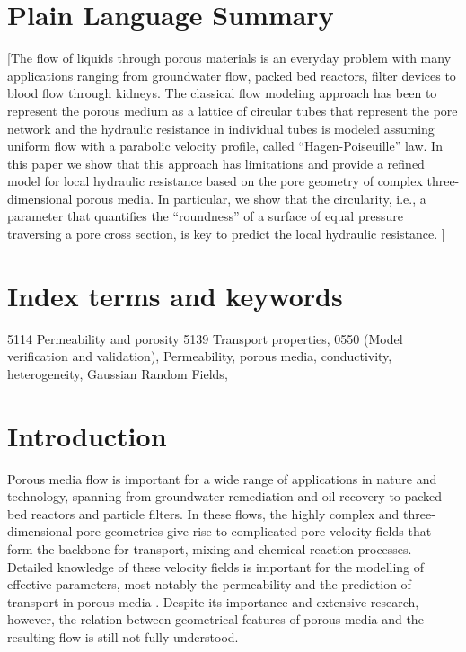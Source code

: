 \documentclass[draft]{agujournal2019}
\begin{document}
\section*{Plain Language Summary}
[The flow of liquids through porous materials is an everyday problem with many applications ranging from groundwater flow, packed bed reactors, filter devices to blood flow through kidneys. The classical flow modeling approach has been to represent the porous medium as a lattice of circular tubes that represent the pore network and the hydraulic resistance in individual tubes is modeled assuming uniform flow with a parabolic velocity profile, called “Hagen-Poiseuille” law. In this paper we show that this approach has limitations and provide a refined model for local hydraulic resistance based on the pore geometry of complex three-dimensional porous media. In particular, we show that the circularity, i.e., a parameter that quantifies the “roundness” of a surface of equal pressure traversing a pore cross section, is key to predict the local hydraulic resistance.
]

\section*{Index terms and keywords}
5114 Permeability and porosity 5139 Transport properties, 0550 (Model verification and validation), Permeability, porous media, conductivity, heterogeneity, Gaussian Random Fields, 

%
%

\section{Introduction}

Porous media flow is important for a wide range of applications in nature and technology, spanning from groundwater remediation and oil recovery to packed bed reactors and particle filters. In these flows, the highly complex and three-dimensional pore geometries give rise to complicated pore velocity fields that form the backbone for transport, mixing and chemical reaction processes. Detailed knowledge of these velocity fields is important for the modelling of effective parameters, most notably the permeability and the prediction of transport in porous media \cite{bear_dynamics_1972,scheidegger_physics_1974}. Despite its importance and extensive research, however, the relation between geometrical features of porous media and the resulting flow is still not fully understood.
\end{document}
